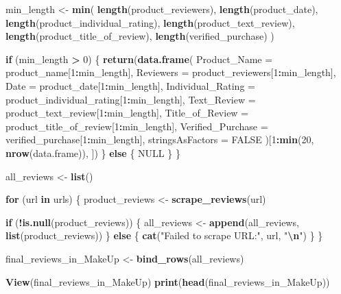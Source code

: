 \documentclass[
  11pt,
]{article}
\newenvironment{Shaded}{\begin{snugshade}}{\end{snugshade}}
\newcommand{\AttributeTok}[1]{\textcolor[rgb]{0.13,0.29,0.53}{#1}}
\newcommand{\ConstantTok}[1]{\textcolor[rgb]{0.56,0.35,0.01}{#1}}
\newcommand{\ControlFlowTok}[1]{\textcolor[rgb]{0.13,0.29,0.53}{\textbf{#1}}}
\newcommand{\DecValTok}[1]{\textcolor[rgb]{0.00,0.00,0.81}{#1}}
\newcommand{\FunctionTok}[1]{\textcolor[rgb]{0.13,0.29,0.53}{\textbf{#1}}}
\newcommand{\NormalTok}[1]{#1}
\newcommand{\OtherTok}[1]{\textcolor[rgb]{0.56,0.35,0.01}{#1}}
\newcommand{\SpecialCharTok}[1]{\textcolor[rgb]{0.81,0.36,0.00}{\textbf{#1}}}
\newcommand{\StringTok}[1]{\textcolor[rgb]{0.31,0.60,0.02}{#1}}
\begin{document}
\begin{Shaded}
\begin{Highlighting}[]
\NormalTok{  min\_length }\OtherTok{\textless{}{-}} \FunctionTok{min}\NormalTok{(}
    \FunctionTok{length}\NormalTok{(product\_reviewers),}
    \FunctionTok{length}\NormalTok{(product\_date),}
    \FunctionTok{length}\NormalTok{(product\_individual\_rating),}
    \FunctionTok{length}\NormalTok{(product\_text\_review),}
    \FunctionTok{length}\NormalTok{(product\_title\_of\_review),}
    \FunctionTok{length}\NormalTok{(verified\_purchase)}
\NormalTok{  )}
  
  \ControlFlowTok{if}\NormalTok{ (min\_length }\SpecialCharTok{\textgreater{}} \DecValTok{0}\NormalTok{) \{}
    \FunctionTok{return}\NormalTok{(}\FunctionTok{data.frame}\NormalTok{(}
      \AttributeTok{Product\_Name =}\NormalTok{ product\_name[}\DecValTok{1}\SpecialCharTok{:}\NormalTok{min\_length],}
      \AttributeTok{Reviewers =}\NormalTok{ product\_reviewers[}\DecValTok{1}\SpecialCharTok{:}\NormalTok{min\_length],}
      \AttributeTok{Date =}\NormalTok{ product\_date[}\DecValTok{1}\SpecialCharTok{:}\NormalTok{min\_length],}
      \AttributeTok{Individual\_Rating =}\NormalTok{ product\_individual\_rating[}\DecValTok{1}\SpecialCharTok{:}\NormalTok{min\_length],}
      \AttributeTok{Text\_Review =}\NormalTok{ product\_text\_review[}\DecValTok{1}\SpecialCharTok{:}\NormalTok{min\_length],}
      \AttributeTok{Title\_of\_Review =}\NormalTok{ product\_title\_of\_review[}\DecValTok{1}\SpecialCharTok{:}\NormalTok{min\_length],}
      \AttributeTok{Verified\_Purchase =}\NormalTok{ verified\_purchase[}\DecValTok{1}\SpecialCharTok{:}\NormalTok{min\_length],}
      \AttributeTok{stringsAsFactors =} \ConstantTok{FALSE}
\NormalTok{    )[}\DecValTok{1}\SpecialCharTok{:}\FunctionTok{min}\NormalTok{(}\DecValTok{20}\NormalTok{, }\FunctionTok{nrow}\NormalTok{(data.frame)), ])}
\NormalTok{  \} }\ControlFlowTok{else}\NormalTok{ \{}
    \ConstantTok{NULL}
\NormalTok{  \}}
\NormalTok{\}}


\NormalTok{all\_reviews }\OtherTok{\textless{}{-}} \FunctionTok{list}\NormalTok{()}

\ControlFlowTok{for}\NormalTok{ (url }\ControlFlowTok{in}\NormalTok{ urls) \{}
\NormalTok{  product\_reviews }\OtherTok{\textless{}{-}} \FunctionTok{scrape\_reviews}\NormalTok{(url)}
  
  \ControlFlowTok{if}\NormalTok{ (}\SpecialCharTok{!}\FunctionTok{is.null}\NormalTok{(product\_reviews)) \{}
\NormalTok{    all\_reviews }\OtherTok{\textless{}{-}} \FunctionTok{append}\NormalTok{(all\_reviews, }\FunctionTok{list}\NormalTok{(product\_reviews))}
\NormalTok{  \} }\ControlFlowTok{else}\NormalTok{ \{}
    \FunctionTok{cat}\NormalTok{(}\StringTok{"Failed to scrape URL:"}\NormalTok{, url, }\StringTok{"}\SpecialCharTok{\textbackslash{}n}\StringTok{"}\NormalTok{)}
\NormalTok{  \}}
\NormalTok{\}}


\NormalTok{final\_reviews\_in\_MakeUp }\OtherTok{\textless{}{-}} \FunctionTok{bind\_rows}\NormalTok{(all\_reviews)}


\FunctionTok{View}\NormalTok{(final\_reviews\_in\_MakeUp)}
\FunctionTok{print}\NormalTok{(}\FunctionTok{head}\NormalTok{(final\_reviews\_in\_MakeUp))}
\end{Highlighting}
\end{Shaded}
\end{document}

